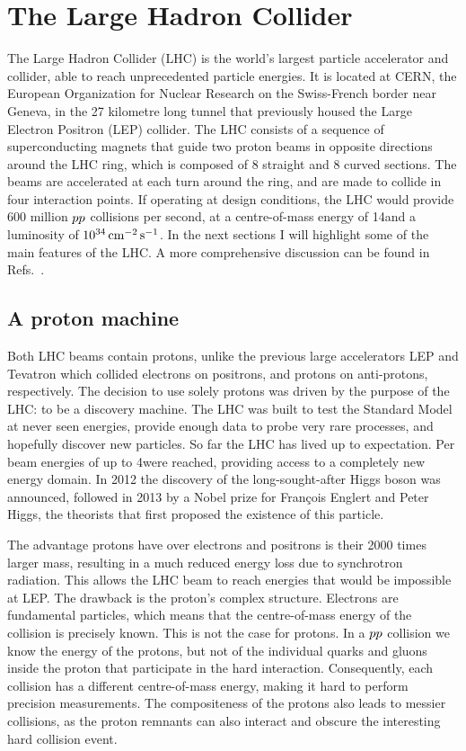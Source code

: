 \chapter{The Large Hadron Collider \label{chap:LHC}}

The Large Hadron Collider (LHC) is the world's largest particle accelerator and collider, able to
reach unprecedented particle energies. It is located at CERN, the European Organization for Nuclear
Research on the Swiss-French border near Geneva, in the 27 kilometre long tunnel that previously
housed the Large Electron Positron (LEP) collider. The LHC consists of a sequence of superconducting
magnets that guide two proton beams in opposite directions around the LHC ring, which is composed
of 8 straight and 8 curved sections. 
The beams are accelerated at each turn around the ring, and are made to collide in four interaction
points.
If operating at design conditions, the LHC would provide 600 million ${p}{p}$
collisions per second, at a centre-of-mass energy of 14\TeV and a luminosity of
$\text{10}^\text{34}\,\text{cm}^\text{$-$2}\,\text{s}^\text{$-$1}$. 
In the next sections I will highlight some of the main features of the LHC. A more comprehensive
discussion
can be found in Refs.~\cite{Evans:2008zzb,Bruning:2007zzc,Lefevre:1165534,LHC_website}. 

\section{A proton machine \label{sec:LHC_proton_machine}}

Both LHC beams contain protons, unlike the previous large accelerators LEP and Tevatron which
collided electrons on positrons, and protons on anti-protons, respectively. 
The decision to use solely protons was driven by the purpose of the LHC: to be a discovery machine.
The LHC was built to test the Standard Model at never seen energies, provide enough data to
probe very rare processes, and hopefully discover new particles. So far the LHC has lived up to
expectation. Per beam energies of up to 4\TeV were reached, providing access to a completely new
energy domain. In 2012 the discovery of the long-sought-after Higgs boson was announced, followed in
2013 by a Nobel prize for Fran\c{c}ois Englert and Peter Higgs, the theorists that first proposed
the existence of this particle. 

The advantage protons have over electrons and positrons is their 2000 times larger mass, resulting
in a much reduced energy loss due to synchrotron radiation. This allows the LHC beam to reach
energies that would be impossible at LEP.
The drawback is the proton's complex structure. Electrons are fundamental particles, which
means that the centre-of-mass energy of the collision is precisely known. This is not the case for
protons. In a ${p}{p}$ collision we know the energy of the protons, but not of the individual quarks
and gluons inside the proton that participate in the hard interaction. Consequently, each collision
has a different centre-of-mass energy, making it hard to perform precision measurements. The
compositeness
of the protons also leads to messier collisions, as the proton remnants can also interact and
obscure the interesting hard collision event. 

